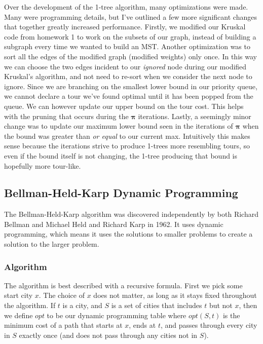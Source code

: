 \documentclass[11pt]{article}
\newcommand{\ve}[1]{\boldsymbol{#1}}
\begin{document}
	Over the development of the 1-tree algorithm, many optimizations were made. Many were programming details, but I've outlined a few more significant changes that together greatly increased performance. Firstly, we modified our Kruskal code from homework 1 to work on the subsets of our graph, instead of building a subgraph every time we wanted to build an MST. Another optimization was to sort all the edges of the modified graph (modified weights) only once. In this way we can choose the two edges incident to our \emph{ignored} node during our modified Kruskal's algorithm, and not need to re-sort when we consider the next node to ignore. Since we are branching on the smallest lower bound in our priority queue, we cannot declare a tour we've found optimal until it has been popped from the queue. We can however update our upper bound on the tour cost. This helps with the pruning that occurs during the $\ve{\pi}$ iterations. Lastly, a seemingly minor change was to update our maximum lower bound seen in the iterations of $\ve{\pi}$ when the bound was greater than \emph{or equal} to our current max. Intuitively this makes sense because the iterations strive to produce 1-trees more resembling tours, so even if the bound itself is not changing, the 1-tree producing that bound is hopefully more tour-like.
	
	\subsection{Bellman-Held-Karp Dynamic Programming}
	
	The Bellman-Held-Karp algorithm was discovered independently by both Richard Bellman \cite{Bellman} and Michael Held and Richard Karp \cite{HeldKarp} in 1962. It uses dynamic programming, which means it uses the solutions to smaller problems to create a solution to the larger problem.
	
	\subsubsection{Algorithm}
	
	The algorithm is best described with a recursive formula. First we pick some start city $x$. The choice of $x$ does not matter, as long as it stays fixed throughout the algorithm. If $t$ is a city, and $S$ is a set of cities that includes $t$ but not $x$, then we define $opt$ to be our dynamic programming table where $opt(S,t)$ is the minimum cost of a path that starts at $x$, ends at $t$, and passes through every city in $S$ exactly once (and does not pass through any cities not in $S$).
	
\end{document}
